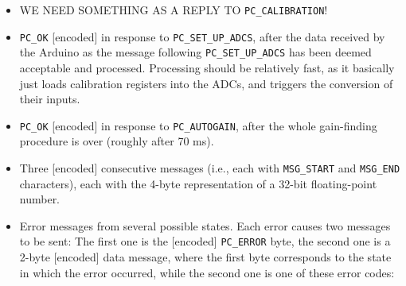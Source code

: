\documentclass[11pt,a4paper,english]{article}
\begin{document}
\begin{itemize}
\item WE NEED SOMETHING AS A REPLY TO \texttt{PC\_CALIBRATION}! 
\item \texttt{PC\_OK} [encoded] in response to \texttt{PC\_SET\_UP\_ADCS}, after the data received by the Arduino as the message following \texttt{PC\_SET\_UP\_ADCS} has been deemed acceptable and processed. Processing should be relatively fast, as it basically just loads calibration registers into the ADCs, and triggers the conversion of their inputs.
\item \texttt{PC\_OK} [encoded] in response to \texttt{PC\_AUTOGAIN}, after the whole gain-finding procedure is over (roughly after 70 ms).
\item Three [encoded] consecutive messages (i.e., each with \texttt{MSG\_START} and \texttt{MSG\_END} characters), each with the 4-byte representation of a 32-bit floating-point number.
\item Error messages from several possible states. Each error causes two messages to be sent: The first one is the [encoded] \texttt{PC\_ERROR} byte, the second one is a 2-byte [encoded] data message, where the first byte corresponds to the state in which the error occurred, while the second one is one of these error codes:


\end{itemize}
\end{document}
